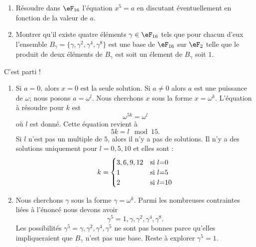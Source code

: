 \begin{example}
    \begin{enumerate}
        \item
            Résoudre dans \( \eF_{16}\) l'équation \( x^5=a\) en discutant éventuellement en fonction de la valeur de \( a\).
        \item
            Montrer qu'il existe quatre éléments \( \gamma\in\eF_{16}\) tels que pour chacun d'eux l'ensemble \( B_{\gamma}=\{ \gamma,\gamma^2,\gamma^4,\gamma^8 \}\) est une base de \( \eF_{16}\) sur \( \eF_2\) telle que le produit de deux éléments de \( B_{\gamma}\) est soit un élement de \( B_{\gamma}\) soit \( 1\).
    \end{enumerate}

    C'est parti !

    \begin{enumerate}
        \item
            Si \( a=0\), alors \( x=0\) est la seule solution. Si \( a\neq 0 \) alors \( a\) est une puissance de \( \omega\); nous posons \( a=\omega^l\). Nous cherchons \( x\) sous la forme \( x=\omega^k\). L'équation à résoudre pour \( k\) est
            \begin{equation}
                \omega^{5k}=\omega^l
            \end{equation}
            où \( l\) est donné. Cette équation revient à 
            \begin{equation}
                5k=l\mod 15.
            \end{equation}
            Si \( l\) n'est pas un multiple de \( 5\), alors il n'y a pas de solutions. Il n'y a des solutions uniquement pour \( l=0,5,10\) et elles sont :
            \begin{equation}
                k=\begin{cases}
                    3,6,9,12     &   \text{si \( l\)=0}\\
                    1     &   \text{si \( l\)=5}\\
                    2     &   \text{si \( l\)=10}
                \end{cases}
            \end{equation}
        \item
            Nous cherchons \( \gamma\) sous la forme \( \gamma=\omega^k\). Parmi les nombreuses contraintes liées à l'énoncé nous devons avoir
            \begin{equation}
                \gamma^5=1,\gamma,\gamma^2,\gamma^4,\gamma^8.
            \end{equation}
            Les possibilités \( \gamma^5=\gamma,\gamma^2,\gamma^4,\gamma^5\) ne sont pas bonnes parce qu'elles impliqueraient que \( B_{\gamma}\) n'est pas une base. Reste à explorer \( \gamma^5=1\).


\end{enumerate}
\end{example}
